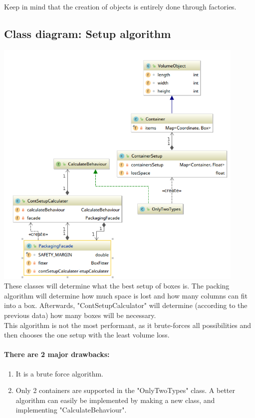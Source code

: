 \documentclass[a4paper,12pt]{article}
\begin{document}
Keep in mind that the creation of objects is entirely done through factories.

\pagebreak


\subsection{Class diagram: Setup algorithm}
\includegraphics[width=12cm]{Class_diagram_setup_classes.png}\\
These classes will determine what the best setup of boxes is. The packing algorithm will determine how much space is lost and how many columns can fit into a box. Afterwards, "ContSetupCalculator" will determine (according to the previous data) how many boxes will be necessary.\\

This algorithm is not the most performant, as it brute-forces all possibilities and then chooses the one setup with the least volume loss.\\

\paragraph{There are 2 major drawbacks:}
\begin{enumerate}
	\item It is a brute force algorithm.
	\item Only 2 containers are supported in the "OnlyTwoTypes" class. A better algorithm can easily be implemented by making a new class, and implementing "CalculateBehaviour". 
\end{enumerate}
\end{document}
